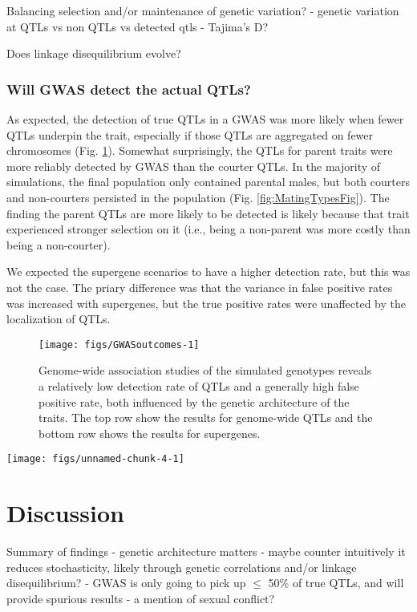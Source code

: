 \documentclass[11pt,]{article}
\begin{document}
Balancing selection and/or maintenance of genetic variation?
- genetic variation at QTLs vs non QTLs vs detected qtls
- Tajima's D?

Does linkage disequilibrium evolve?

\hypertarget{will-gwas-detect-the-actual-qtls}{%
\subsubsection{Will GWAS detect the actual QTLs?}\label{will-gwas-detect-the-actual-qtls}}

As expected, the detection of true QTLs in a GWAS was more likely when fewer QTLs underpin the trait, especially if those QTLs are aggregated on fewer chromosomes (Fig. \ref{fig:GWASoutcomes}). Somewhat surprisingly, the QTLs for parent traits were more reliably detected by GWAS than the courter QTLs. In the majority of simulations, the final population only contained parental males, but both courters and non-courters persisted in the population (Fig. \ref{fig:MatingTypesFig}). The finding the parent QTLs are more likely to be detected is likely because that trait experienced stronger selection on it (i.e., being a non-parent was more costly than being a non-courter).

We expected the supergene scenarios to have a higher detection rate, but this was not the case. The priary difference was that the variance in false positive rates was increased with supergenes, but the true positive rates were unaffected by the localization of QTLs.

\begin{figure}[H]
\texttt{[image: figs/GWASoutcomes-1]} \caption{Genome-wide association studies of the simulated genotypes reveals a relatively low detection rate of QTLs and a generally high false positive rate, both influenced by the genetic architecture of the traits. The top row show the results for genome-wide QTLs and the bottom row shows the results for supergenes.}\label{fig:GWASoutcomes}
\end{figure}

\texttt{[image: figs/unnamed-chunk-4-1]}

\hypertarget{discussion}{%
\section{Discussion}\label{discussion}}

Summary of findings
- genetic architecture matters
- maybe counter intuitively it reduces stochasticity, likely through genetic correlations and/or linkage disequilibrium?
- GWAS is only going to pick up \(\le\) 50\% of true QTLs, and will provide spurious results
- a mention of sexual conflict?
\end{document}
